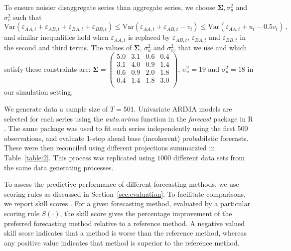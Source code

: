 \documentclass[a4paper, 11pt]{article}
\theoremstyle{theo}
\theoremstyle{definition}
\begin{document}
To ensure noisier disaggregate series than aggregate series, we choose $\bm{\Sigma}, \sigma^2_u$ and $\sigma^2_v$ such that
$$
\text{Var}(\varepsilon_{AA,t}+\varepsilon_{AB,t}+\varepsilon_{BA,t}+\varepsilon_{BB,t}) \le \text{Var}(\varepsilon_{AA,t}+\varepsilon_{AB,t}-v_t) \le \text{Var}(\varepsilon_{AA,t}+u_t-0.5v_t)\,,
$$
and similar inequalities hold when $\varepsilon_{AA,t}$ is replaced by $\varepsilon_{AB,t}$, $\varepsilon_{BA,t}$ and $\varepsilon_{BB,t}$ in the second and third terms.
The values of $\bm{\Sigma}$, $\sigma^2_u$ and $\sigma^2_v$, that we use and which satisfy these constraints are:
$\bm{\Sigma} =
\begin{pmatrix}
5.0 & 3.1 & 0.6 & 0.4 \\
3.1 & 4.0 & 0.9 & 1.4 \\
0.6 & 0.9 & 2.0 & 1.8 \\
0.4 & 1.4 & 1.8 & 3.0 \\
\end{pmatrix}$,
$\sigma^2_u = 19$ and $\sigma^2_u = 18$ in our simulation setting.

We generate data a sample size of $T=501$. Univariate ARIMA models are selected for each series using the \textit{auto.arima} function in the \textit{forecast} package \citep{hyndman2017forecasting} in R \citep{Rcore}.  The same package was used to fit each series independently using the first 500 observations, and evaluate 1-step ahead base (incoherent) probabilstic forecasts. These were then reconciled using different projections summarzied in Table~\ref{table:2}. This process was replicated using $1000$ different data sets from the same data generating processes.

To assess the predictive performance of different forecasting methods, we use scoring rules as discussed in Section~\ref{sec:evaluation}. To facilitate comparisons, we report skill scores \citep{Gneiting2007}. For a given forecasting method, evaluated by a particular scoring rule $S(\cdot)$, the skill score %
gives the percentage improvement of the preferred forecasting method relative to a reference method. A negative valued skill score indicates that a method is worse than the reference method, whereas any positive value indicates that method is superior to the reference method.
\end{document}
